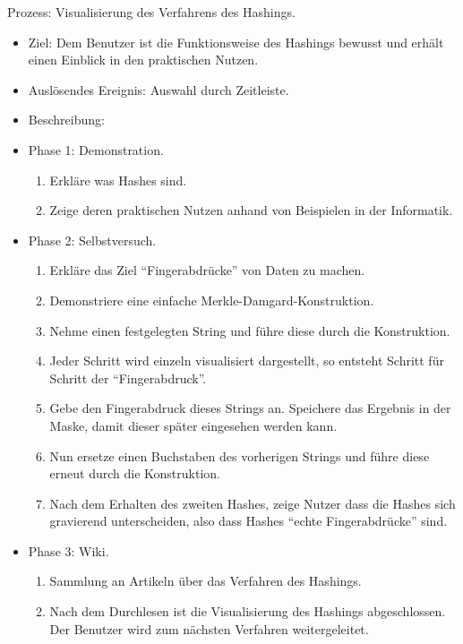 \documentclass{article}
\begin{document}
\begin{FA}[start=600]
 \item Prozess: Visualisierung des Verfahrens des Hashings.
\end{FA}
\begin{itemize}[label={}]

 \item Ziel: Dem Benutzer ist die Funktionsweise des Hashings bewusst und erhält 
       einen Einblick in den praktischen Nutzen.

 \item Auslösendes Ereignis: Auswahl durch Zeitleiste.

 \item Beschreibung:

 \item Phase 1: Demonstration.

	\begin{enumerate}[]
	 \item Erkläre was Hashes sind.
	 \item Zeige deren praktischen Nutzen anhand von Beispielen in der Informatik.
	\end{enumerate}

 \item Phase 2: Selbstversuch.

	\begin{enumerate}
	 \item Erkläre das Ziel ``Fingerabdrücke'' von Daten zu machen.
	 \item Demonstriere eine einfache Merkle-Damgard-Konstruktion.
	 \item Nehme einen festgelegten String und führe diese durch die Konstruktion.
	 \item Jeder Schritt wird einzeln visualisiert dargestellt, so entsteht Schritt für Schritt der ``Fingerabdruck''.
	 \item Gebe den Fingerabdruck dieses Strings an. Speichere das Ergebnis in der Maske, damit dieser später eingesehen werden kann.
	 \item Nun ersetze einen Buchstaben des vorherigen Strings und führe diese erneut durch die Konstruktion.
	 \item Nach dem Erhalten des zweiten Hashes, zeige Nutzer dass die Hashes sich gravierend unterscheiden, also dass Hashes ``echte Fingerabdrücke'' sind.
	\end{enumerate}

 \item Phase 3: Wiki.

	\begin{enumerate}
	 \item Sammlung an Artikeln über das Verfahren des Hashings.
	 \item Nach dem Durchlesen ist die Visualisierung des Hashings abgeschlossen. Der Benutzer wird zum nächsten Verfahren weitergeleitet.
 	\end{enumerate}

\end{itemize}
\end{document}
